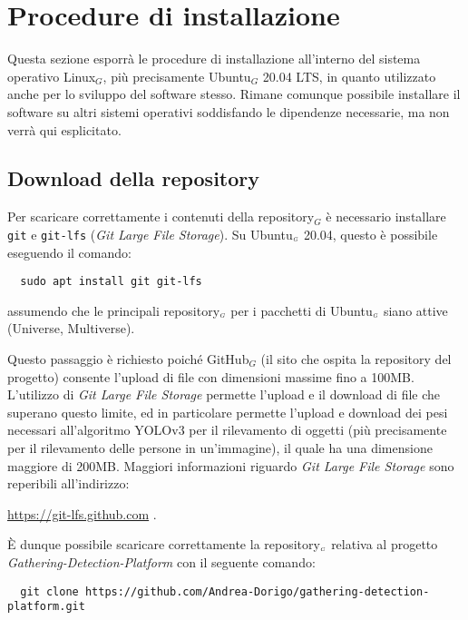 \chapter{Procedure di installazione}\label{ProceduraDiInstallazione}
Questa sezione esporrà le procedure di installazione all'interno del sistema operativo Linux$_G$, più precisamente Ubuntu$_G$ 20.04 LTS, in quanto utilizzato anche per lo sviluppo del software stesso.
Rimane comunque possibile installare il software su altri sistemi operativi soddisfando le dipendenze necessarie, ma non verrà qui esplicitato.

\section{Download della repository}\label{ProceduraDiInstallazioneDownloadRepo}
Per scaricare correttamente i contenuti della repository$_G$ è necessario installare \texttt{git} e \texttt{git-lfs} (\textit{Git Large File Storage}).
Su Ubuntu$_{\scaleto{G}{3pt}}$ 20.04, questo è possibile eseguendo il comando:
\begin{lstlisting}
  sudo apt install git git-lfs
\end{lstlisting}
assumendo che le principali repository$_{\scaleto{G}{3pt}}$ per i pacchetti di Ubuntu$_{\scaleto{G}{3pt}}$ siano attive (Universe, Multiverse).

Questo passaggio è richiesto poiché GitHub$_G$ (il sito che ospita la repository del progetto) consente l'upload di file con dimensioni massime fino a 100MB.
L'utilizzo di \textit{Git Large File Storage} permette l'upload e il download di file che superano questo limite, ed in particolare permette l'upload e download dei pesi necessari all'algoritmo YOLOv3 per il rilevamento di oggetti (più precisamente per il rilevamento delle persone in un'immagine), il quale ha una dimensione maggiore di 200MB. Maggiori informazioni riguardo \textit{Git Large File Storage} sono reperibili all'indirizzo:
\begin{center}
  \item \url{https://git-lfs.github.com} .
\end{center}

È dunque possibile scaricare correttamente la repository$_{\scaleto{G}{3pt}}$ relativa al progetto \textit{Gathering-Detection-Platform} con il seguente comando:
\begin{lstlisting}
  git clone https://github.com/Andrea-Dorigo/gathering-detection-platform.git
\end{lstlisting}

